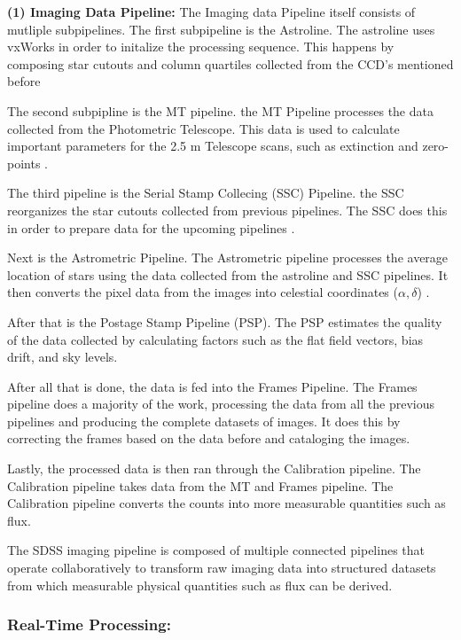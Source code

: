 \documentclass[preprint,linenumbers, longauthor]{aastex631}
\begin{document}
 \textbf{(1) Imaging Data Pipeline:} 
  The Imaging data Pipeline itself consists of mutliple subpipelines. 
  The first subpipeline is the Astroline. The astroline uses vxWorks in order to initalize the processing sequence.
  This happens by composing star cutouts and column quartiles collected from the CCD's mentioned before \cite{luptonSDSSImagingPipelines2001}

  The second subpipline is the MT pipeline. the MT Pipeline processes the data collected from the Photometric Telescope. 
  This data is used to calculate important parameters for the 2.5 m Telescope scans, such as extinction and zero-points \cite{luptonSDSSImagingPipelines2001}.

  The third pipeline is the Serial Stamp Collecing (SSC) Pipeline. the SSC reorganizes the star cutouts collected from previous pipelines.
  The SSC does this in order to prepare data for the upcoming pipelines \cite{luptonSDSSImagingPipelines2001}.

  Next is the Astrometric Pipeline. The Astrometric pipeline processes the average location of stars using the data collected from the astroline and SSC pipelines. 
  It then converts the pixel data from the images into celestial coordinates ($\alpha, \delta$) \cite{luptonSDSSImagingPipelines2001}.

  After that is the Postage Stamp Pipeline (PSP). 
  The PSP estimates the quality of the data collected by calculating factors such as the flat field vectors, bias drift, and sky levels.

  After all that is done, the data is fed into the Frames Pipeline. The Frames pipeline does a majority of the work, processing the data from all the previous pipelines and producing the complete datasets of images.
  It does this by correcting the frames based on the data before and cataloging the images.

  Lastly, the processed data is then ran through the Calibration pipeline. The Calibration pipeline takes data from the MT and Frames pipeline. The Calibration pipeline converts the counts into more measurable quantities such as flux.

The SDSS imaging pipeline is composed of multiple connected pipelines that operate collaboratively to transform raw imaging data into structured datasets from which measurable physical quantities such as flux can be derived.

  \subsubsection{Real-Time Processing:} 
\end{document}

